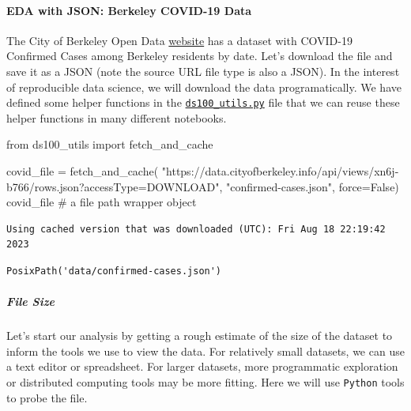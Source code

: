 \documentclass[
  letterpaper,
  DIV=11,
  numbers=noendperiod]{scrreprt}
\let\oldparagraph\paragraph
\renewcommand{\paragraph}[1]{\oldparagraph{#1}\mbox{}}
\let\oldsubparagraph\subparagraph
\renewcommand{\subparagraph}[1]{\oldsubparagraph{#1}\mbox{}}
\newenvironment{Shaded}{\begin{snugshade}}{\end{snugshade}}
\newcommand{\CommentTok}[1]{\textcolor[rgb]{0.37,0.37,0.37}{#1}}
\newcommand{\ImportTok}[1]{\textcolor[rgb]{0.00,0.46,0.62}{#1}}
\newcommand{\NormalTok}[1]{\textcolor[rgb]{0.00,0.23,0.31}{#1}}
\newcommand{\OperatorTok}[1]{\textcolor[rgb]{0.37,0.37,0.37}{#1}}
\newcommand{\StringTok}[1]{\textcolor[rgb]{0.13,0.47,0.30}{#1}}
\newcommand{\VariableTok}[1]{\textcolor[rgb]{0.07,0.07,0.07}{#1}}
\begin{document}
\hypertarget{eda-with-json-berkeley-covid-19-data}{%
\paragraph{EDA with JSON: Berkeley COVID-19
Data}\label{eda-with-json-berkeley-covid-19-data}}

The City of Berkeley Open Data
\href{https://data.cityofberkeley.info/Health/COVID-19-Confirmed-Cases/xn6j-b766}{website}
has a dataset with COVID-19 Confirmed Cases among Berkeley residents by
date. Let's download the file and save it as a JSON (note the source URL
file type is also a JSON). In the interest of reproducible data science,
we will download the data programatically. We have defined some helper
functions in the
\href{https://ds100.org/fa23/resources/assets/lectures/lec05/lec05-eda.html}{\texttt{ds100\_utils.py}}
file that we can reuse these helper functions in many different
notebooks.

\begin{Shaded}
\begin{Highlighting}[]
\ImportTok{from}\NormalTok{ ds100\_utils }\ImportTok{import}\NormalTok{ fetch\_and\_cache}

\NormalTok{covid\_file }\OperatorTok{=}\NormalTok{ fetch\_and\_cache(}
    \StringTok{"https://data.cityofberkeley.info/api/views/xn6j{-}b766/rows.json?accessType=DOWNLOAD"}\NormalTok{,}
    \StringTok{"confirmed{-}cases.json"}\NormalTok{,}
\NormalTok{    force}\OperatorTok{=}\VariableTok{False}\NormalTok{)}
\NormalTok{covid\_file          }\CommentTok{\# a file path wrapper object}
\end{Highlighting}
\end{Shaded}

\begin{verbatim}
Using cached version that was downloaded (UTC): Fri Aug 18 22:19:42 2023
\end{verbatim}

\begin{verbatim}
PosixPath('data/confirmed-cases.json')
\end{verbatim}

\hypertarget{file-size}{%
\subparagraph{File Size}\label{file-size}}

Let's start our analysis by getting a rough estimate of the size of the
dataset to inform the tools we use to view the data. For relatively
small datasets, we can use a text editor or spreadsheet. For larger
datasets, more programmatic exploration or distributed computing tools
may be more fitting. Here we will use \texttt{Python} tools to probe the
file.
\end{document}
